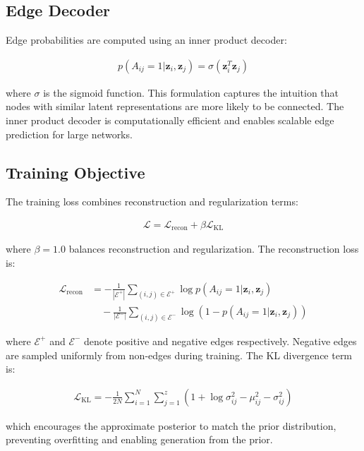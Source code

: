 \documentclass[12pt]{article}
\begin{document}
\subsection{Edge Decoder}

Edge probabilities are computed using an inner product decoder:

\begin{align}
p(A_{ij} = 1 | \mathbf{z}_i, \mathbf{z}_j) = \sigma(\mathbf{z}_i^T \mathbf{z}_j)
\end{align}

where $\sigma$ is the sigmoid function. This formulation captures the intuition that nodes with similar latent representations are more likely to be connected. The inner product decoder is computationally efficient and enables scalable edge prediction for large networks.

\subsection{Training Objective}

The training loss combines reconstruction and regularization terms:

\begin{align}
\mathcal{L} = \mathcal{L}_{\text{recon}} + \beta \mathcal{L}_{\text{KL}}
\end{align}

where $\beta = 1.0$ balances reconstruction and regularization. The reconstruction loss is:

\begin{align}
\mathcal{L}_{\text{recon}} &= -\frac{1}{|\mathcal{E}^+|} \sum_{(i,j) \in \mathcal{E}^+} \log p(A_{ij} = 1 | \mathbf{z}_i, \mathbf{z}_j) \\
&\quad - \frac{1}{|\mathcal{E}^-|} \sum_{(i,j) \in \mathcal{E}^-} \log(1 - p(A_{ij} = 1 | \mathbf{z}_i, \mathbf{z}_j))
\end{align}

where $\mathcal{E}^+$ and $\mathcal{E}^-$ denote positive and negative edges respectively. Negative edges are sampled uniformly from non-edges during training. The KL divergence term is:

\begin{align}
\mathcal{L}_{\text{KL}} = -\frac{1}{2N} \sum_{i=1}^{N} \sum_{j=1}^{z} (1 + \log\sigma_{ij}^2 - \mu_{ij}^2 - \sigma_{ij}^2)
\end{align}

which encourages the approximate posterior to match the prior distribution, preventing overfitting and enabling generation from the prior.
\end{document}
